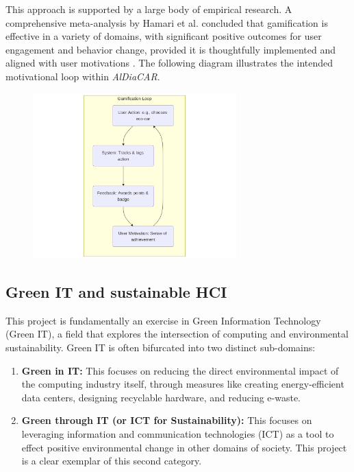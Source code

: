 This approach is supported by a large body of empirical research. A comprehensive meta-analysis by Hamari et al. concluded that gamification is effective in a variety of domains, with significant positive outcomes for user engagement and behavior change, provided it is thoughtfully implemented and aligned with user motivations \cite{hamari2014does}. The following diagram illustrates the intended motivational loop within \textit{AlDiaCAR}.

\begin{figure}[H]
    \centering
    \includegraphics[width=0.7\textwidth]{images/background/gamification-mermaid.png}
\end{figure}

\subsection{Green IT and sustainable HCI}
This project is fundamentally an exercise in Green Information Technology (Green IT), a field that explores the intersection of computing and environmental sustainability. Green IT is often bifurcated into two distinct sub-domains:
\begin{enumerate}
    \item \textbf{Green in IT:} This focuses on reducing the direct environmental impact of the computing industry itself, through measures like creating energy-efficient data centers, designing recyclable hardware, and reducing e-waste.
    \item \textbf{Green through IT (or ICT for Sustainability):} This focuses on leveraging information and communication technologies (ICT) as a tool to effect positive environmental change in other domains of society. This project is a clear exemplar of this second category.
\end{enumerate}

